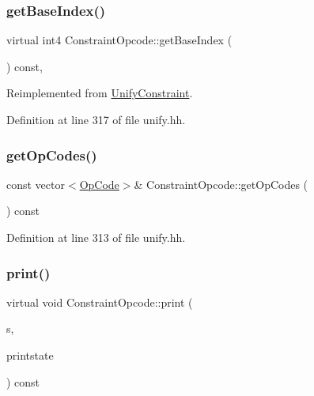 \subsubsection{\texorpdfstring{getBaseIndex()}{getBaseIndex()}}
{\footnotesize\ttfamily virtual int4 Constraint\+Opcode\+::get\+Base\+Index (\begin{DoxyParamCaption}\item[{void}]{ }\end{DoxyParamCaption}) const\hspace{0.3cm}{\ttfamily [inline]}, {\ttfamily [virtual]}}



Reimplemented from \mbox{\hyperlink{class_unify_constraint_a44f0164f38ac1fdc44fc73ebe7678de1}{Unify\+Constraint}}.



Definition at line 317 of file unify.\+hh.

\mbox{\label{class_constraint_opcode_a8fc20418a32489ad2485e01a853ea98b}} 
\subsubsection{\texorpdfstring{getOpCodes()}{getOpCodes()}}
{\footnotesize\ttfamily const vector$<$\mbox{\hyperlink{opcodes_8hh_abeb7dfb0e9e2b3114e240a405d046ea7}{Op\+Code}}$>$\& Constraint\+Opcode\+::get\+Op\+Codes (\begin{DoxyParamCaption}\item[{void}]{ }\end{DoxyParamCaption}) const\hspace{0.3cm}{\ttfamily [inline]}}



Definition at line 313 of file unify.\+hh.

\mbox{\label{class_constraint_opcode_a4ae4b3306f7bf7fa9fb55bd142a7cf47}} 
\subsubsection{\texorpdfstring{print()}{print()}}
{\footnotesize\ttfamily virtual void Constraint\+Opcode\+::print (\begin{DoxyParamCaption}\item[{ostream \&}]{s,  }\item[{\mbox{\hyperlink{class_unify_c_printer}{Unify\+C\+Printer}} \&}]{printstate }\end{DoxyParamCaption}) const\hspace{0.3cm}{\ttfamily [virtual]}}



